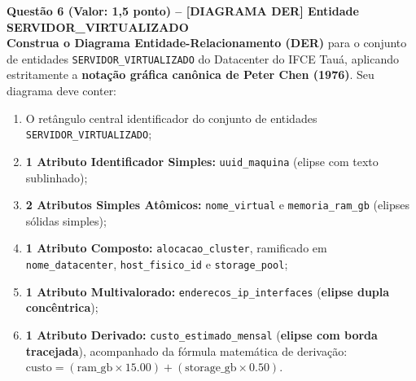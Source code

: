 \documentclass[11pt,a4paper]{article}
\begin{document}
\noindent\textbf{Questão 6 (Valor: 1,5 ponto) -- [DIAGRAMA DER] Entidade SERVIDOR\_VIRTUALIZADO}\\[0.1cm]
\textbf{Construa o Diagrama Entidade-Relacionamento (DER)} para o conjunto de entidades \texttt{SERVIDOR\_VIRTUALIZADO} do Datacenter do IFCE Tauá, aplicando estritamente a \textbf{notação gráfica canônica de Peter Chen (1976)}. Seu diagrama deve conter:
\begin{enumerate}[label=\alph*),itemsep=1pt]
  \item O retângulo central identificador do conjunto de entidades \texttt{SERVIDOR\_VIRTUALIZADO};
  \item \textbf{1 Atributo Identificador Simples:} \texttt{uuid\_maquina} (elipse com texto sublinhado);
  \item \textbf{2 Atributos Simples Atômicos:} \texttt{nome\_virtual} e \texttt{memoria\_ram\_gb} (elipses sólidas simples);
  \item \textbf{1 Atributo Composto:} \texttt{alocacao\_cluster}, ramificado em \texttt{nome\_datacenter}, \texttt{host\_fisico\_id} e \texttt{storage\_pool};
  \item \textbf{1 Atributo Multivalorado:} \texttt{enderecos\_ip\_interfaces} (\textbf{elipse dupla concêntrica});
  \item \textbf{1 Atributo Derivado:} \texttt{custo\_estimado\_mensal} (\textbf{elipse com borda tracejada}), acompanhado da fórmula matemática de derivação: $\text{custo} = (\text{ram\_gb} \times 15.00) + (\text{storage\_gb} \times 0.50)$.
\end{enumerate}
\end{document}
